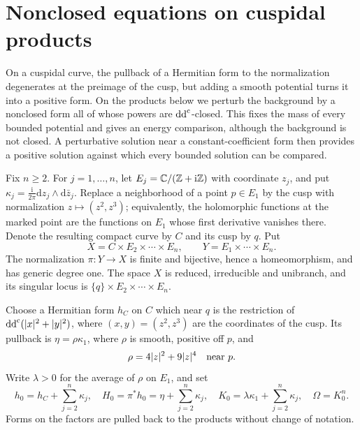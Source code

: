 \section{Nonclosed equations on cuspidal products}
\label{sec:nonclosed-cuspidal-products}

On a cuspidal curve, the pullback of a Hermitian form to the normalization degenerates at the preimage of the cusp, but adding a smooth potential turns it into a positive form. On the products below we perturb the background by a nonclosed form all of whose powers are $\mathrm{dd}^{\mathrm{c}}$-closed. This fixes the mass of every bounded potential and gives an energy comparison, although the background is not closed. A perturbative solution near a constant-coefficient form then provides a positive solution against which every bounded solution can be compared.

Fix $n\geq2$. For $j=1,\ldots,n$, let $E_j=\mathbb C/(\mathbb Z+\mathrm i\mathbb Z)$ with coordinate $z_j$, and put $\kappa_j=\frac{\mathrm i}{2\pi}\mathrm dz_j\wedge\mathrm d\bar z_j$. Replace a neighborhood of a point $p\in E_1$ by the cusp with normalization $z\mapsto(z^2,z^3)$; equivalently, the holomorphic functions at the marked point are the functions on $E_1$ whose first derivative vanishes there. Denote the resulting compact curve by $C$ and its cusp by $q$. Put
\[
 X=C\times E_2\times\cdots\times E_n,\qquad
 Y=E_1\times\cdots\times E_n.
\]
The normalization $\pi\colon Y\to X$ is finite and bijective, hence a homeomorphism, and has generic degree one. The space $X$ is reduced, irreducible and unibranch, and its singular locus is $\{q\}\times E_2\times\cdots\times E_n$.

Choose a Hermitian form $h_C$ on $C$ which near $q$ is the restriction of $\mathrm{dd}^{\mathrm{c}}(|x|^2+|y|^2)$, where $(x,y)=(z^2,z^3)$ are the coordinates of the cusp. Its pullback is $\eta=\rho\kappa_1$, where $\rho$ is smooth, positive off $p$, and
\begin{equation}\label{eq:cuspidal-reference-density}
 \rho=4|z|^2+9|z|^4\quad\hbox{near }p.
\end{equation}
Write $\lambda>0$ for the average of $\rho$ on $E_1$, and set
\[
 h_0=h_C+\sum_{j=2}^n\kappa_j,\quad
 H_0=\pi^*h_0=\eta+\sum_{j=2}^n\kappa_j,\quad
 K_0=\lambda\kappa_1+\sum_{j=2}^n\kappa_j,\quad \Omega=K_0^n.
\]
Forms on the factors are pulled back to the products without change of notation.

